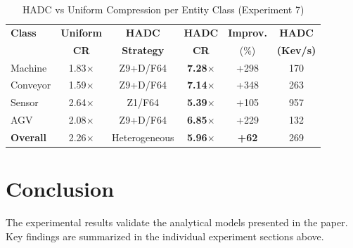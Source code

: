 \documentclass[11pt]{article}
\begin{document}
\begin{table}[htbp]
\centering
\caption{HADC vs Uniform Compression per Entity Class (Experiment 7)}
\label{tab:hadc_comparison}
\begin{tabular}{lccccc}
\toprule
\textbf{Class} & \textbf{Uniform} & \textbf{HADC} & \textbf{HADC} & \textbf{Improv.} & \textbf{HADC} \\
 & \textbf{CR} & \textbf{Strategy} & \textbf{CR} & (\%) & \textbf{(Kev/s)} \\
\midrule
Machine & 1.83$\times$ & Z9+D/F64 & \textbf{7.28}$\times$ & +298 & 170 \\
Conveyor & 1.59$\times$ & Z9+D/F64 & \textbf{7.14}$\times$ & +348 & 263 \\
Sensor & 2.64$\times$ & Z1/F64 & \textbf{5.39}$\times$ & +105 & 957 \\
AGV & 2.08$\times$ & Z9+D/F64 & \textbf{6.85}$\times$ & +229 & 132 \\
\midrule
\textbf{Overall} & 2.26$\times$ & Heterogeneous & \textbf{5.96}$\times$ & \textbf{+62} & 269 \\
\bottomrule
\end{tabular}
\end{table}

\section{Conclusion}
The experimental results validate the analytical models presented in the paper.
Key findings are summarized in the individual experiment sections above.
\end{document}
